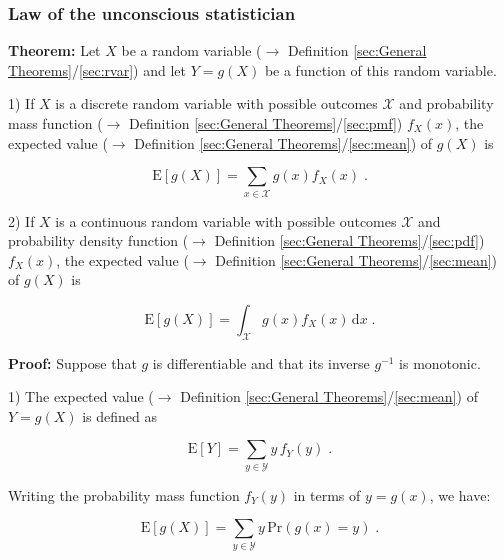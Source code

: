 \documentclass[a4paper,12pt,twoside]{book}
\begin{document}
\subsubsection[\textbf{Law of the unconscious statistician}]{Law of the unconscious statistician} \label{sec:mean-lotus}
\setcounter{equation}{0}

\textbf{Theorem:} Let $X$ be a random variable ($\rightarrow$ Definition \ref{sec:General Theorems}/\ref{sec:rvar}) and let $Y = g(X)$ be a function of this random variable.

1) If $X$ is a discrete random variable with possible outcomes $\mathcal{X}$ and probability mass function ($\rightarrow$ Definition \ref{sec:General Theorems}/\ref{sec:pmf}) $f_X(x)$, the expected value ($\rightarrow$ Definition \ref{sec:General Theorems}/\ref{sec:mean}) of $g(X)$ is

\begin{equation} \label{eq:mean-lotus-mean-lotus-disc}
\mathrm{E}[g(X)] = \sum_{x \in \mathcal{X}} g(x) f_X(x) \; .
\end{equation}

2) If $X$ is a continuous random variable with possible outcomes $\mathcal{X}$ and probability density function ($\rightarrow$ Definition \ref{sec:General Theorems}/\ref{sec:pdf}) $f_X(x)$, the expected value ($\rightarrow$ Definition \ref{sec:General Theorems}/\ref{sec:mean}) of $g(X)$ is

\begin{equation} \label{eq:mean-lotus-mean-lotus-cont}
\mathrm{E}[g(X)] = \int_{\mathcal{X}} g(x) f_X(x) \, \mathrm{d}x \; .
\end{equation}


\vspace{1em}
\textbf{Proof:} Suppose that $g$ is differentiable and that its inverse $g^{-1}$ is monotonic.

1) The expected value ($\rightarrow$ Definition \ref{sec:General Theorems}/\ref{sec:mean}) of $Y = g(X)$ is defined as

\begin{equation} \label{eq:mean-lotus-mean-lotus-disc-s1}
\mathrm{E}[Y] = \sum_{y \in \mathcal{Y}} y \, f_Y(y) \; .
\end{equation}

Writing the probability mass function $f_Y(y)$ in terms of $y = g(x)$, we have:

\begin{equation} \label{eq:mean-lotus-mean-lotus-disc-s2}
\mathrm{E}[g(X)] = \sum_{y \in \mathcal{Y}} y \, \mathrm{Pr}(g(x) = y) \; .
\end{equation}
\end{document}
